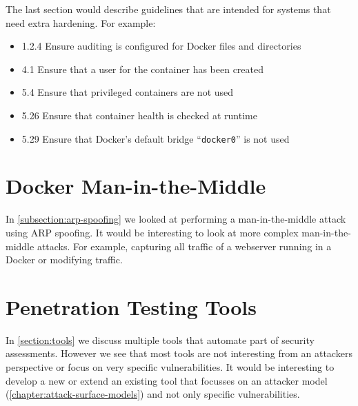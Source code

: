 \medskip

The last section would describe guidelines that are intended for systems that need extra hardening. For example:
\begin{itemize}
    \item 1.2.4 Ensure auditing is configured for Docker files and directories
    \item 4.1 Ensure that a user for the container has been created
    \item 5.4 Ensure that privileged containers are not used
    \item 5.26 Ensure that container health is checked at runtime
    \item 5.29 Ensure that Docker's default bridge ``\lstinline{docker0}'' is not used
\end{itemize}

\section{Docker Man-in-the-Middle}
In \autoref{subsection:arp-spoofing} we looked at performing a man-in-the-middle attack using ARP spoofing. It would be interesting to look at more complex man-in-the-middle attacks. For example, capturing all traffic of a webserver running in a Docker or modifying traffic.

\section{Penetration Testing Tools}
In \autoref{section:tools} we discuss multiple tools that automate part of security assessments. However we see that most tools are not interesting from an attackers perspective or focus on very specific vulnerabilities. It would be interesting to develop a new or extend an existing tool that focusses on an attacker model (\autoref{chapter:attack-surface-models}) and not only specific vulnerabilities.
